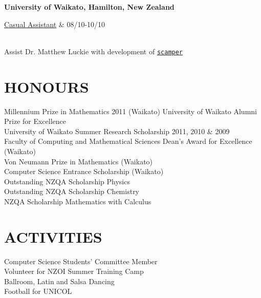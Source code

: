 \documentclass[margin,11pt]{res} %
\begin{document}
\begin{resume}
                {\bf University of Waikato, Hamilton, New Zealand} \\
                \begin{ncolumn}{2} %
                \underline{Casual Assistant} &   08/10-10/10
                \end{ncolumn} \\
                Assist Dr. Matthew Luckie with development of
                \href{http://www.wand.net.nz/scamper}{\tt{scamper}}


\section{HONOURS}
				Millennium Prize in Mathematics 2011 (Waikato)
				University of Waikato Alumni Prize for Excellence \\
				University of Waikato Summer Research Scholarship 2011, 2010 \& 2009 \\
				Faculty of Computing and Mathematical Sciences Dean's Award for Excellence (Waikato) \\
				Von Neumann Prize in Mathematics (Waikato) \\
				Computer Science Entrance Scholarship (Waikato) \\
				Outstanding NZQA Scholarship Physics \\
				Outstanding NZQA Scholarship Chemistry \\
				NZQA Scholarship Mathematics with Calculus \\


\section{ACTIVITIES}
				Computer Science Students' Committee Member \\
				Volunteer for NZOI Summer Training Camp \\
				Ballroom, Latin and Salsa Dancing \\
				Football for UNICOL \\


\end{resume}
\end{document}
